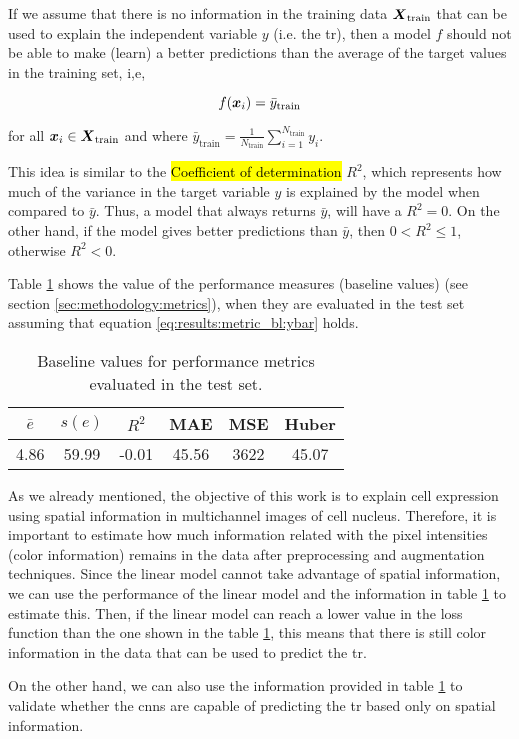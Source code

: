 

\graphicspath{{./Sections/Results/Resources/}}

If we assume that there is no information in the training data $\boldsymbol{X}_\text{train}$ that can be used to explain the independent variable $y$ (i.e. the \gls{tr}), then a model $f$ should not be able to make (learn) a better predictions than the average of the target values in the training set, i,e,

\begin{equation}
  f(\boldsymbol{x}_i)=\bar{y}_\text{train}
  \label{eq:results:metric_bl:ybar}
\end{equation}

\noindent for all $\boldsymbol{x}_i \in \boldsymbol{X}_\text{train}$ and where $\bar{y}_\text{train}=\frac{1}{N_\text{train}}\sum_{i=1}^{N_\text{train}}y_i$.

This idea is similar to the \hl{Coefficient of determination} $R^2$, which represents how much of the variance in the target variable $y$ is explained by the model when compared to $\bar{y}$.
Thus, a model that always returns $\bar{y}$, will have a $R^2=0$. On the other hand, if the model gives better predictions than $\bar{y}$, then $0 < R^2 \leq 1$, otherwise $R^2 < 0$.

Table \ref{table:results:metric_bl_vals} shows the value of the performance measures (baseline values) (see section \ref{sec:methodology:metrics}), when they are evaluated in the test set assuming that equation \ref{eq:results:metric_bl:ybar} holds.

\begin{table}[!ht]
  \centering
  \begin{tabular}{c|c|c|c|c|c}
    \hline
    $\bar{e}$ & $s(e)$ & $R^2$ & MAE & MSE & Huber \\
    \hline
     4.86 & 59.99 & -0.01 & 45.56 & 3622 & 45.07 \\
    \hline
  \end{tabular}
  \caption{Baseline values for performance metrics evaluated in the test set.}
  \label{table:results:metric_bl_vals}
\end{table}

As we already mentioned, the objective of this work is to explain cell expression using spatial information in multichannel images of cell nucleus.
Therefore, it is important to estimate how much information related with the pixel intensities (color information) remains in the data after preprocessing and augmentation techniques.
Since the linear model cannot take advantage of spatial information, we can use the performance of the linear model and the information in table \ref{table:results:metric_bl_vals} to estimate this.
Then, if the linear model can reach a lower value in the loss function than the one shown in the table \ref{table:results:metric_bl_vals}, this means that there is still color information in the data that can be used to predict the \gls{tr}.

On the other hand, we can also use the information provided in table \ref{table:results:metric_bl_vals} to validate whether the \glspl{cnn} are capable of predicting the \gls{tr} based only on spatial information.
